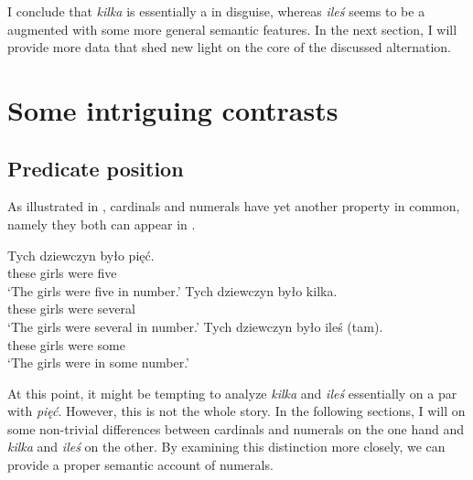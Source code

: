 \documentclass[output=paper, newtxmath, colorlinks, citecolor=brown]{langsci/langscibook}
\begin{document}
	I conclude that \textit{kilka} is essentially a  in disguise, whereas \textit{ileś} seems to be a  augmented with some more general semantic features. In the next section, I will provide more data that shed new light on the core of the discussed alternation.

	\section{Some intriguing contrasts}\label{sec:some-intriguing-contrasts}

	\subsection{Predicate position}\label{sec:predicate-position}

	 As illustrated in ,  cardinals and  numerals have yet another property in common, namely they both can appear in .

	\ea \label{ex:predicate-position} \ea \gll Tych dziewczyn było pięć.\\
	these girls were five\\
	\glt `The girls were five in number.'
	\ex \gll Tych dziewczyn było kilka.\\
	these girls were several\\
	\glt `The girls were several in number.'
	\ex \gll Tych dziewczyn było {ileś (tam)}.\\
	these girls were some\\
	\glt `The girls were in some number.'
	\z
    \z

	\noindent At this point, it might be tempting to analyze \textit{kilka} and \textit{ileś} essentially on a par with \textit{pięć}. However, this is not the whole story. In the following sections, I will  on some non-trivial differences between cardinals and  numerals on the one hand and \textit{kilka} and \textit{ileś} on the other. By examining this distinction more closely, we can provide a proper semantic account of   numerals.
\end{document}
